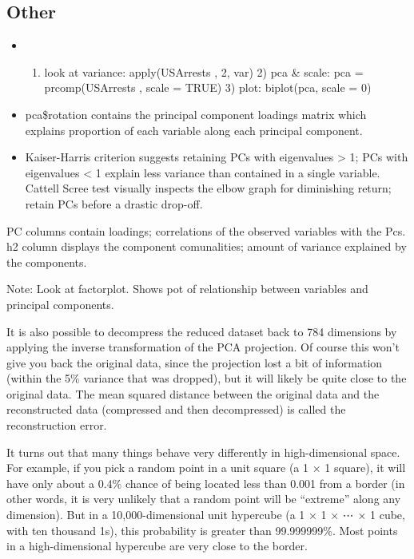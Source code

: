 \documentclass[]{book}
\providecommand{\tightlist}{%
  \setlength{\itemsep}{0pt}\setlength{\parskip}{0pt}}
\theoremstyle{definition}
\theoremstyle{definition}
\theoremstyle{definition}
\theoremstyle{remark}
\begin{document}
\subsection{Other}\label{other-3}

\begin{itemize}
\item
  \begin{enumerate}
  \def\labelenumi{\arabic{enumi})}
  \tightlist
  \item
    look at variance: apply(USArrests , 2, var) \textbar{} 2) pca \&
    scale: pca = prcomp(USArrests , scale = TRUE) \textbar{} 3) plot:
    biplot(pca, scale = 0)
  \end{enumerate}
\item
  pca\$rotation contains the principal component loadings matrix which
  explains proportion of each variable along each principal component.
\item
  Kaiser-Harris criterion suggests retaining PCs with eigenvalues
  \textgreater{} 1; PCs with eigenvalues \textless{} 1 explain less
  variance than contained in a single variable. Cattell Scree test
  visually inspects the elbow graph for diminishing return; retain PCs
  before a drastic drop-off.
\end{itemize}

PC columns contain loadings; correlations of the observed variables with
the Pcs. h2 column displays the component comunalities; amount of
variance explained by the components.

Note: Look at factorplot. Shows pot of relationship between variables
and principal components.

It is also possible to decompress the reduced dataset back to 784
dimensions by applying the inverse transformation of the PCA projection.
Of course this won't give you back the original data, since the
projection lost a bit of information (within the 5\% variance that was
dropped), but it will likely be quite close to the original data. The
mean squared distance between the original data and the reconstructed
data (compressed and then decompressed) is called the reconstruction
error.

It turns out that many things behave very differently in
high-dimensional space. For example, if you pick a random point in a
unit square (a 1 × 1 square), it will have only about a 0.4\% chance of
being located less than 0.001 from a border (in other words, it is very
unlikely that a random point will be ``extreme'' along any dimension).
But in a 10,000-dimensional unit hypercube (a 1 × 1 × ⋯ × 1 cube, with
ten thousand 1s), this probability is greater than 99.999999\%. Most
points in a high-dimensional hypercube are very close to the border.
\end{document}
